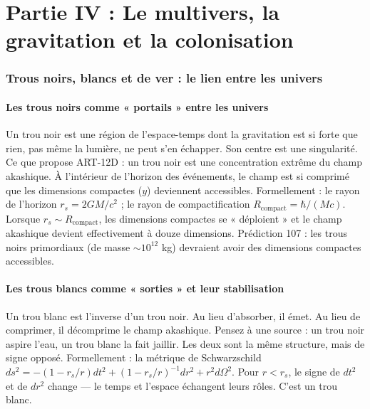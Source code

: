 \part*{Partie IV : Le multivers, la gravitation et la colonisation}

\section{Trous noirs, blancs et de ver : le lien entre les univers}
\subsection{Les trous noirs comme « portails » entre les univers}
Un trou noir est une région de l'espace-temps dont la gravitation est si forte que rien, pas même la lumière, ne peut s'en échapper. Son centre est une singularité. Ce que propose ART-12D : un trou noir est une concentration extrême du champ akashique. À l'intérieur de l'horizon des événements, le champ est si comprimé que les dimensions compactes ($y$) deviennent accessibles. Formellement : le rayon de l'horizon $r_s = 2GM/c^2$ ; le rayon de compactification $R_{\text{compact}} = \hbar/(Mc)$. Lorsque $r_s \sim R_{\text{compact}}$, les dimensions compactes se « déploient » et le champ akashique devient effectivement à douze dimensions. Prédiction 107 : les trous noirs primordiaux (de masse $\sim 10^{12}$ kg) devraient avoir des dimensions compactes accessibles.

\subsection{Les trous blancs comme « sorties » et leur stabilisation}
Un trou blanc est l'inverse d'un trou noir. Au lieu d'absorber, il émet. Au lieu de comprimer, il décomprime le champ akashique. Pensez à une source : un trou noir aspire l'eau, un trou blanc la fait jaillir. Les deux sont la même structure, mais de signe opposé. Formellement : la métrique de Schwarzschild $ds^2 = -(1-r_s/r)dt^2 + (1-r_s/r)^{-1}dr^2 + r^2 d\Omega^2$. Pour $r < r_s$, le signe de $dt^2$ et de $dr^2$ change --- le temps et l'espace échangent leurs rôles. C'est un trou blanc.

